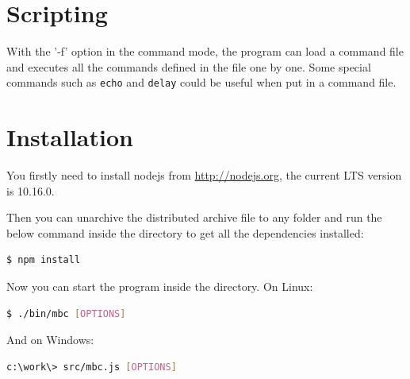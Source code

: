 \documentclass[a4paper,latin]{paper}
\begin{document}
\section{Scripting}
With the '-f' option in the command mode, the program can load a command file
and executes all the commands defined in the file one by one. Some special commands
such as \texttt{echo} and \texttt{delay} could be useful when put in a command
file.

\section{Installation}

You firstly need to install nodejs from \url{http://nodejs.org}, the current LTS version
is 10.16.0.

Then you can unarchive the distributed archive file to any folder and run the below
command inside the directory to get all the dependencies installed:
\noindent\begin{lstlisting}[language=bash]
  $ npm install
\end{lstlisting}

Now you can start the program inside the directory. On Linux:
\noindent\begin{lstlisting}[language=bash]
  $ ./bin/mbc [OPTIONS]
\end{lstlisting}

And on Windows:
\noindent\begin{lstlisting}[language=bash]
  c:\work\> src/mbc.js [OPTIONS]
\end{lstlisting}
\end{document}
